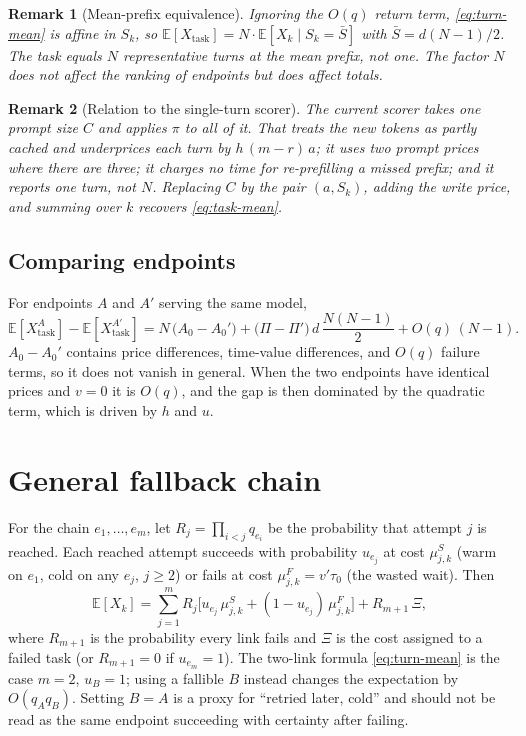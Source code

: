 \documentclass[11pt]{article}
\newtheorem{remark}{Remark}
\newcommand{\E}{\mathbb{E}}
\begin{document}
\begin{remark}[Mean-prefix equivalence]
Ignoring the $O(q)$ return term, \eqref{eq:turn-mean} is affine in $S_k$, so
$\E[X_{\text{task}}] = N \cdot \E[X_k \mid S_k = \bar S]$ with
$\bar S = d(N-1)/2$. The task equals $N$ representative turns at the mean
prefix, not one. The factor $N$ does not affect the ranking of endpoints but
does affect totals.
\end{remark}

\begin{remark}[Relation to the single-turn scorer]
The current scorer takes one prompt size $C$ and applies $\pi$ to all of it.
That treats the new tokens as partly cached and underprices each turn by
$h\,(m - r)\,a$; it uses two prompt prices where there are three; it charges no time for re-prefilling a missed prefix; and it reports
one turn, not $N$. Replacing $C$ by the pair $(a, S_k)$, adding the write price,
and summing over $k$ recovers \eqref{eq:task-mean}.
\end{remark}

\subsection{Comparing endpoints}

For endpoints $A$ and $A'$ serving the same model,
\begin{equation}\label{eq:compare}
  \E[X^{A}_{\text{task}}] - \E[X^{A'}_{\text{task}}]
  = N\,\big(A_0 - A_0'\big) + \big(\Pi - \Pi'\big)\, d\, \frac{N(N-1)}{2}
  + O(q)\,(N-1).
\end{equation}
$A_0 - A_0'$ contains price differences, time-value differences, and $O(q)$
failure terms, so it does not vanish in general. When the two endpoints have
identical prices and $v = 0$ it is $O(q)$, and the gap is then dominated by the
quadratic term, which is driven by $h$ and $u$.

\section{General fallback chain}\label{sec:chain}

For the chain $e_1, \dots, e_m$, let $R_j = \prod_{i<j} q_{e_i}$ be the
probability that attempt $j$ is reached. Each reached attempt succeeds with
probability $u_{e_j}$ at cost $\mu^{S}_{j,k}$ (warm on $e_1$, cold on any
$e_j$, $j \ge 2$) or fails at cost $\mu^{F}_{j,k} = v'\tau_0$ (the wasted
wait). Then
\begin{equation}\label{eq:chain}
  \E[X_k] = \sum_{j=1}^{m} R_j \Big[ u_{e_j}\,\mu^{S}_{j,k} + (1 - u_{e_j})\,\mu^{F}_{j,k} \Big]
  + R_{m+1}\, \Xi ,
\end{equation}
where $R_{m+1}$ is the probability every link fails and $\Xi$ is the cost
assigned to a failed task (or $R_{m+1} = 0$ if $u_{e_m} = 1$). The two-link
formula \eqref{eq:turn-mean} is the case $m = 2$, $u_B = 1$; using a fallible
$B$ instead changes the expectation by $O(q_A q_B)$. Setting $B = A$ is a
proxy for ``retried later, cold'' and should not be read as the same endpoint
succeeding with certainty after failing.
\end{document}

